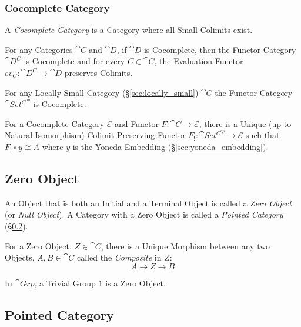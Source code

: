 \subsubsection{Cocomplete Category}\label{sec:cocomplete_category}

A \emph{Cocomplete Category} is a Category where all Small Colimits
exist.

For any Categories $\cat{C}$ and $\cat{D}$, if $\cat{D}$ is
Cocomplete, then the Functor Category $\cat{D^C}$ is Cocomplete and
for every $C \in \cat{C}$, the Evaluation Functor $ev_C :
\cat{D^C} \rightarrow \cat{D}$ preserves Colimits.

For any Locally Small Category (\S\ref{sec:locally_small})
$\cat{C}$ the Functor Category $\cat{Set^{C^{op}}}$ is
Cocomplete.

For a Cocomplete Category $\mathcal{E}$ and Functor $F : \cat{C}
\rightarrow \mathcal{E}$, there is a Unique (up to Natural
Isomorphism) Colimit Preserving Functor $F_! : \cat{Set^{C^{op}}}
\rightarrow \mathcal{E}$ such that $F_! \circ y \cong A$ where $y$ is
the Yoneda Embedding (\S\ref{sec:yoneda_embedding}).\cite{awodey06}



\subsection{Zero Object}\label{sec:zero_object}

An Object that is both an Initial and a Terminal Object is called a
\emph{Zero Object} (or \emph{Null Object}). A Category with a Zero
Object is called a \emph{Pointed Category}
(\S\ref{sec:pointed_category}).

For a Zero Object, $Z \in \cat{C}$, there is a Unique Morphism
between any two Objects, $A, B \in \cat{C}$ called the
\emph{Composite} in $Z$:
\[
  A \rightarrow Z \rightarrow B
\]

In $\cat{Grp}$, a Trivial Group ${1}$ is a Zero Object.



\subsection{Pointed Category}\label{sec:pointed_category}



